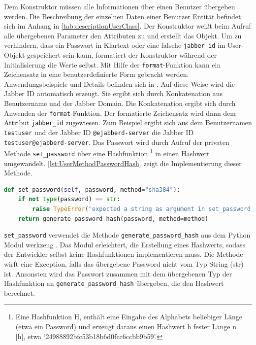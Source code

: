 \documentclass[a4paper,titlepage,halfparskip,12pt]{scrreprt}
\begin{document}
\begin{onehalfspacing}
Dem Konstruktor müssen alle Informationen über einen Benutzer übergeben werden. Die Beschreibung der einzelnen Daten einer Benutzer Entität befindet sich im Anhang in \autoref{tab:descriptionUserClass}. Der Konstruktor weißt beim Aufruf alle übergebenen Parameter den Attributen zu und erstellt das Objekt. Um zu verhindern, dass ein Passwort in Klartext oder eine falsche \texttt{jabber\_id} im User-Objekt gespeichert sein kann, formatiert der Konstruktor während der Initialisierung die Werte selbst. Mit Hilfe der \texttt{format}-Funktion kann ein Zeichensatz in eine benutzerdefinierte Form gebracht werden. Anwendungsbeispiele und Details befinden sich in \cite{pythonFormat}. Auf diese Weise wird die Jabber ID automatisch erzeugt. Sie ergibt sich durch Konkatenation aus Benutzername und der Jabber Domain. Die Konkatenation ergibt sich durch Anwenden der \texttt{format}-Funktion. Der formatierte Zeichensatz wird dann dem Attribut \texttt{jabber\_id} zugewiesen. Zum Beispiel ergibt sich aus dem Benutzernamen \texttt{testuser} und der Jabber ID \texttt{@ejabberd-server} die Jabber ID \texttt{testuser@ejabberd-server}. Das Passwort wird durch Aufruf der privaten Methode \texttt{set\_password} über eine Hashfunktion \footnote{Eine Hashfunktion H, enthält eine Eingabe des Alphabets beliebiger Länge (etwa ein Password) und erzeugt daraus einen Hashwert h fester Länge n = |h|, etwa ‘24988892bfc53b18b6d0fcc6ccbb9b59’.\cite{wendzel2018}} in einen Hashwert umgewandelt. \autoref{lst:UserMethodPasswordHash} zeigt die Implementierung dieser Methode.

\begin{lstlisting}[language=python, caption={Methode zur Berechnung des Password Hashes}, label={lst:UserMethodPasswordHash}]
def set_password(self, password, method="sha384"):
    if not type(password) == str:
        raise TypeError("expected a string as argument in set_password function.")
    return generate_password_hash(password, method=method)
\end{lstlisting}

\texttt{set\_password} verwendet die Methode \texttt{generate\_password\_hash} aus dem Python Modul werkzeug \cite{werkzeugDoc}. Das Modul erleichtert, die Erstellung eines Hashwerts, sodass der Entwickler selbst keine Hashfunktionen implementieren muss. Die Methode wirft eine Exception, falls das übergebene Password nicht vom Typ String (str) ist. Ansonsten wird das Passwort zusammen mit dem übergebenen Typ der Hashfunktion an \texttt{generate\_password\_hash} übergeben, die den Hashwert berechnet.


\end{onehalfspacing}
\end{document}
